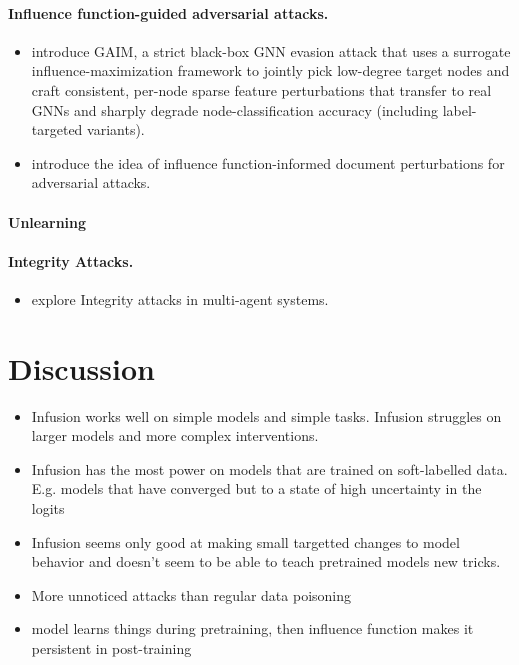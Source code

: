 \documentclass{article}
\theoremstyle{plain}
\theoremstyle{definition}
\theoremstyle{remark}
\begin{document}
\paragraph{Influence function-guided adversarial attacks.}
\begin{itemize}
    \item \citet{yang2025gaim} introduce GAIM, a strict black-box GNN evasion attack that uses a surrogate influence-maximization framework to jointly pick low-degree target nodes and craft consistent, per-node sparse feature perturbations that transfer to real GNNs and sharply degrade node-classification accuracy (including label-targeted variants).
    \item \citet{koh2017understanding} introduce the idea of influence function-informed document perturbations for adversarial attacks.
\end{itemize}

\paragraph{Unlearning}

\paragraph{Integrity Attacks.}
\begin{itemize}
    \item \citet{zheng2025demonstrations} explore Integrity attacks in multi-agent systems.
\end{itemize}


\section{Discussion}
\begin{itemize}
    \item Infusion works well on simple models and simple tasks. Infusion struggles on larger models and more complex interventions.
    \item Infusion has the most power on models that are trained on soft-labelled data. E.g. models that have converged but to a state of high uncertainty in the logits
    \item Infusion seems only good at making small targetted changes to model behavior and doesn't seem to be able to teach pretrained models new tricks.
    \item More unnoticed attacks than regular data poisoning
    \item model learns things during pretraining, then influence function makes it persistent in post-training
\end{itemize}
\end{document}
